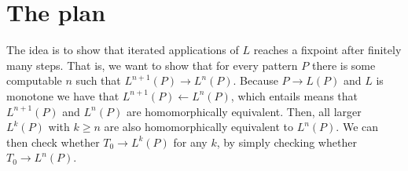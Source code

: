 \documentclass[a4paper]{article}
\begin{document}
\section{The plan}

The idea is to show that iterated applications of $L$ reaches a fixpoint
after finitely many steps. That is, we want to show that for every
pattern $P$ there is some computable $n$ such that $L^{n + 1}(P) \to
L^n(P)$. Because $P \to L(P)$ and $L$ is monotone we have that $L^{n +
1}(P) \leftarrow L^n(P)$, which entails means that $L^{n + 1} (P)$ and
$L^n(P)$ are homomorphically equivalent. Then, all larger $L^k(P)$ with
$k \geq n$ are also homomorphically equivalent to $L^n(P)$. We can then
check whether $T_0 \to L^k(P)$ for any $k$, by simply checking whether
$T_0 \to L^n(P)$.
\end{document}
